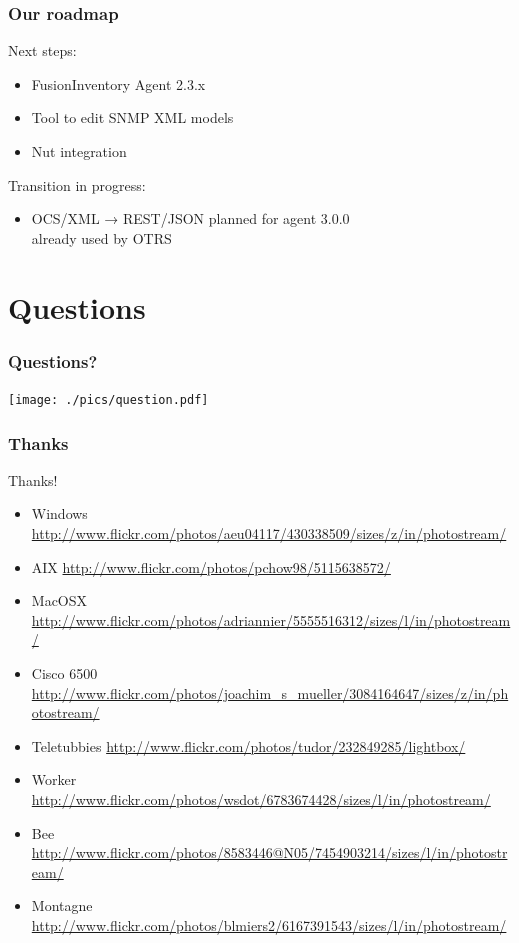 \documentclass{beamer}
\begin{document}
\begin{frame}
    \frametitle{Our roadmap}

    Next steps:
    \begin{itemize}
        \item FusionInventory Agent 2.3.x
        \item Tool to edit SNMP XML models
        \item Nut integration
    \end{itemize}

    Transition in progress:
    \begin{itemize}
        \item OCS/XML → REST/JSON
        \small{planned for agent 3.0.0\\already used by OTRS}
    \end{itemize}

\end{frame}


\section{Questions}

\begin{frame}
    \frametitle{Questions?}

    \begin{center}

    \texttt{[image: ./pics/question.pdf]}

    \end{center}

\end{frame}

\begin{frame}
    \frametitle{Thanks}

    \begin{block}{Thanks!}
        \begin{itemize}
            \item Windows \url{http://www.flickr.com/photos/aeu04117/430338509/sizes/z/in/photostream/}
            \item AIX \url{http://www.flickr.com/photos/pchow98/5115638572/}
            \item MacOSX \url{http://www.flickr.com/photos/adriannier/5555516312/sizes/l/in/photostream/}
            \item Cisco 6500 \url{http://www.flickr.com/photos/joachim\_s\_mueller/3084164647/sizes/z/in/photostream/}
            \item Teletubbies \url{http://www.flickr.com/photos/tudor/232849285/lightbox/}
            \item Worker \url{http://www.flickr.com/photos/wsdot/6783674428/sizes/l/in/photostream/}
            \item Bee \url{http://www.flickr.com/photos/8583446@N05/7454903214/sizes/l/in/photostream/}
            \item Montagne \url{http://www.flickr.com/photos/blmiers2/6167391543/sizes/l/in/photostream/} 
        \end{itemize}
    \end{block}
\end{frame}
\end{document}
